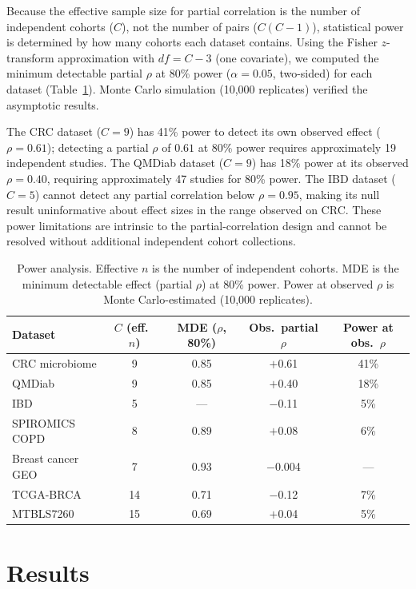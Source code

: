 \documentclass{article}
\begin{document}
Because the effective sample size for partial correlation is the number of independent cohorts ($C$), not the number of pairs ($C(C-1)$), statistical power is determined by how many cohorts each dataset contains. Using the Fisher $z$-transform approximation with $df = C - 3$ (one covariate), we computed the minimum detectable partial $\rho$ at 80\% power ($\alpha = 0.05$, two-sided) for each dataset (Table~\ref{tab:power}). Monte Carlo simulation (10{,}000 replicates) verified the asymptotic results.

The CRC dataset ($C = 9$) has 41\% power to detect its own observed effect ($\rho = 0.61$); detecting a partial $\rho$ of $0.61$ at 80\% power requires approximately 19 independent studies. The QMDiab dataset ($C = 9$) has 18\% power at its observed $\rho = 0.40$, requiring approximately 47 studies for 80\% power. The IBD dataset ($C = 5$) cannot detect any partial correlation below $\rho = 0.95$, making its null result uninformative about effect sizes in the range observed on CRC. These power limitations are intrinsic to the partial-correlation design and cannot be resolved without additional independent cohort collections.

\begin{table}[t]
\centering
\caption{Power analysis. Effective $n$ is the number of independent cohorts. MDE is the minimum detectable effect (partial $\rho$) at 80\% power. Power at observed $\rho$ is Monte Carlo-estimated (10{,}000 replicates).}
\label{tab:power}
\begin{tabular}{lcccc}
\toprule
Dataset & $C$ (eff.\ $n$) & MDE ($\rho$, 80\%) & Obs.\ partial $\rho$ & Power at obs.\ $\rho$ \\
\midrule
CRC microbiome & 9 & 0.85 & $+$0.61 & 41\% \\
QMDiab & 9 & 0.85 & $+$0.40 & 18\% \\
IBD & 5 & --- & $-$0.11 & 5\% \\
SPIROMICS COPD & 8 & 0.89 & $+$0.08 & 6\% \\
Breast cancer GEO & 7 & 0.93 & $-$0.004 & --- \\
TCGA-BRCA & 14 & 0.71 & $-$0.12 & 7\% \\
MTBLS7260 & 15 & 0.69 & $+$0.04 & 5\% \\
\bottomrule
\end{tabular}
\end{table}


\section{Results}
\end{document}
